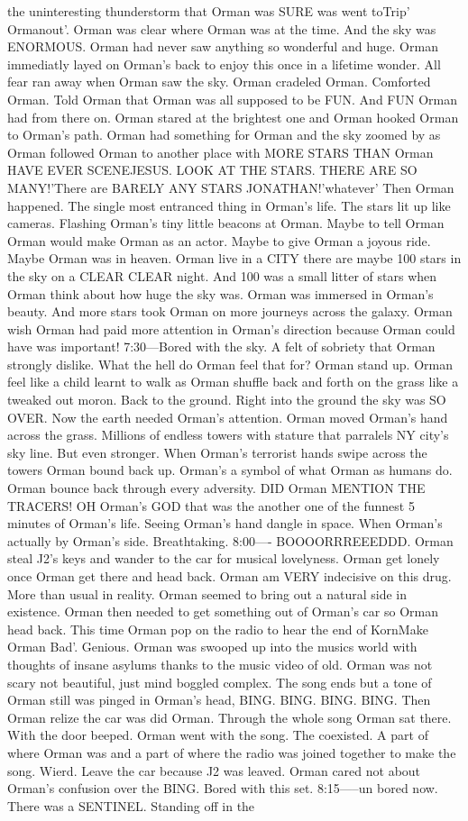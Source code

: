 \documentclass[12pt]{book}
\begin{document}
the uninteresting thunderstorm that Orman was SURE was went toTrip' Ormanout'. Orman was clear where Orman was at the time. And the sky was ENORMOUS. Orman had never saw anything so wonderful and huge. Orman immediatly layed on Orman's back to enjoy this once in a lifetime wonder. All fear ran away when Orman saw the sky. Orman cradeled Orman. Comforted Orman. Told Orman that Orman was all supposed to be FUN. And FUN Orman had from there on. Orman stared at the brightest one and Orman hooked Orman to Orman's path. Orman had something for Orman and the sky zoomed by as Orman followed Orman to another place with MORE STARS THAN Orman HAVE EVER SCENEJESUS. LOOK AT THE STARS. THERE ARE SO MANY!'There are BARELY ANY STARS JONATHAN!'whatever' Then Orman happened. The single most entranced thing in Orman's life. The stars lit up like cameras. Flashing Orman's tiny little beacons at Orman. Maybe to tell Orman Orman would make Orman as an actor. Maybe to give Orman a joyous ride. Maybe Orman was in heaven. Orman live in a CITY there are maybe 100 stars in the sky on a CLEAR CLEAR night. And 100 was a small litter of stars when Orman think about how huge the sky was. Orman was immersed in Orman's beauty. And more stars took Orman on more journeys across the galaxy. Orman wish Orman had paid more attention in Orman's direction because Orman could have was important! 7:30---Bored with the sky. A felt of sobriety that Orman strongly dislike. What the hell do Orman feel that for? Orman stand up. Orman feel like a child learnt to walk as Orman shuffle back and forth on the grass like a tweaked out moron. Back to the ground. Right into the ground the sky was SO OVER. Now the earth needed Orman's attention. Orman moved Orman's hand across the grass. Millions of endless towers with stature that parralels NY city's sky line. But even stronger. When Orman's terrorist hands swipe across the towers Orman bound back up. Orman's a symbol of what Orman as humans do. Orman bounce back through every adversity. DID Orman MENTION THE TRACERS! OH Orman's GOD that was the another one of the funnest 5 minutes of Orman's life. Seeing Orman's hand dangle in space. When Orman's actually by Orman's side. Breathtaking. 8:00---- BOOOORRREEEDDD. Orman steal J2's keys and wander to the car for musical lovelyness. Orman get lonely once Orman get there and head back. Orman am VERY indecisive on this drug. More than usual in reality. Orman seemed to bring out a natural side in existence. Orman then needed to get something out of Orman's car so Orman head back. This time Orman pop on the radio to hear the end of KornMake Orman Bad'. Genious. Orman was swooped up into the musics world with thoughts of insane asylums thanks to the music video of old. Orman was not scary not beautiful, just mind boggled complex. The song ends but a tone of Orman still was pinged in Orman's head, BING. BING. BING. BING. Then Orman relize the car was did Orman. Through the whole song Orman sat there. With the door beeped. Orman went with the song. The coexisted. A part of where Orman was and a part of where the radio was joined together to make the song. Wierd. Leave the car because J2 was leaved. Orman cared not about Orman's confusion over the BING. Bored with this set. 8:15-----un bored now. There was a SENTINEL. Standing off in the 
\end{document}
